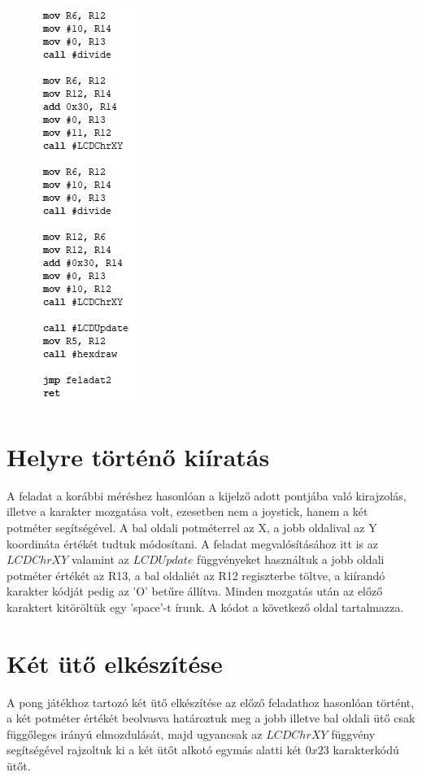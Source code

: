 \documentclass[10pt, conference, a4paper]{ITKproc}
\begin{document}
\begin{figure}[h]
\includegraphics[scale=0.65]{2feladat_02}
\centering
\end{figure}

\section{Helyre történő kiíratás}
A feladat a korábbi méréshez hasonlóan a kijelző adott pontjába való kirajzolás, illetve a karakter mozgatása volt, ezesetben nem a joystick, hanem a két potméter segítségével. A bal oldali potméterrel az X, a jobb oldalival az Y koordináta értékét tudtuk módosítani. A feladat megvalósításához itt is az $LCDChrXY$ valamint az $LCDUpdate$ függvényeket használtuk a jobb oldali potméter értékét az R13, a bal oldaliét az R12 regiszterbe töltve, a kiírandó karakter kódját pedig az 'O' betűre állítva. Minden mozgatás után az előző karaktert kitöröltük egy 'space'-t írunk. 
A kódot a következő oldal tartalmazza. 




\section{Két ütő elkészítése}
A pong játékhoz tartozó két ütő elkészítése az előző feladathoz hasonlóan történt, a két potméter értékét beolvasva határoztuk meg a jobb illetve bal oldali ütő csak függőleges irányú elmozdulását, majd ugyancsak az $LCDChrXY$ függvény segítségével rajzoltuk ki a két ütőt alkotó egymás alatti két $0x23$ karakterkódú ütőt. 
\end{document}
